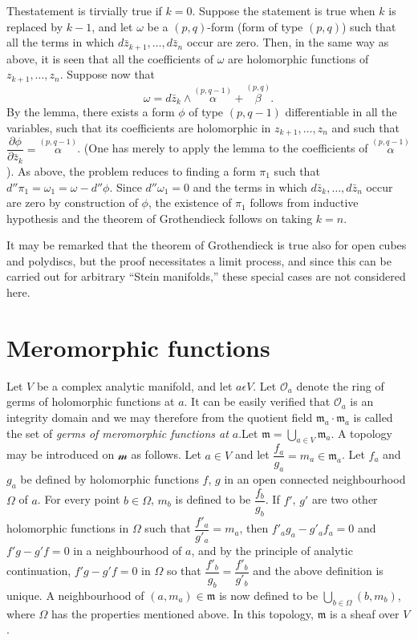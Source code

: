 The\pageoriginale statement is tirvially true if $k=0$. Suppose the
statement is true when $k$ is replaced by $k-1$, and let $\omega$ be a
$(p,q)$-form (form of type $(p,q)$) such that all the terms in which
$d \bar{z}_{k+1}, \ldots, d \bar{z}_n$ occur are zero. Then, in the
same way as above, it is seen that all the coefficients of $\omega$
are holomorphic functions of $z_{k+1}, \ldots, z_n$. Suppose now that
$$
\omega= d \bar{z}_k \wedge \overset{(p,q-1)}{\alpha} +
\overset{(p,q)}{\beta}. 
$$
By the lemma, there exists a form $\phi$ of type $(p, q-1)$
differentiable in all the variables, such that its coefficients are
holomorphic in $z_{k+1}, \ldots, z_n$ and such that $\dfrac{\partial
  \phi}{\partial \bar{z}_k} = \overset{(p,q-1)}{\alpha}$. (One has
merely to apply the lemma to the coefficients of
$\overset{(p,q-1)}{\alpha}$). As above, the problem reduces to finding
a form $\pi_1$ such that $d''\pi_1 = \omega_1 = \omega -
d''\phi$. Since $d''\omega_1 =0$ and the terms in which $d \bar{z}_k,
\ldots, d \bar{z}_n$ occur are zero by construction of $\phi$, the
existence of $\pi_1$ follows from inductive hypothesis and the theorem
of Grothendieck follows on taking $k=n$. 

It may be remarked that the theorem of Grothendieck is true also for
open cubes and polydiscs, but the proof necessitates a limit process,
and since this can be carried out for arbitrary ``Stein manifolds,''
these special cases are not considered here.

\section{Meromorphic functions}\label{chap8:sec4}

Let $V$ be a complex analytic manifold, and let $a \epsilon V$. Let
$\mathscr{O}_a$ denote the ring of germs of holomorphic functions at
$a$. It can be easily verified that $\mathscr{O}_a$ is an integrity
domain and we may therefore from the quotient field $\mathfrak{m}_a
\cdot \mathfrak{m}_a$ is called the set of \textit{germs of meromorphic
functions at $a$}.\pageoriginale Let $\mathfrak{m} = \bigcup\limits_{a
\in V} \mathfrak{m}_a$. A topology may be introduced on $\mathscr{m}$
as follows. Let $a \in V$ and let $\dfrac{f_a}{g_a} = m_a \in
\mathfrak{m}_a$. Let $f_a$ and $g_a$ be defined by holomorphic
functions $f$, $g$ in an open connected neighbourhood $\Omega$ of
$a$. For every point $b \in \Omega$, $m_b$ is defined to be
$\dfrac{f_b}{g_b}$. If $f'$, $g'$ are two other holomorphic functions
in $\Omega$ such that $\dfrac{f'_a}{g'_a} = m_a$, then $f'_a g_a -
g'_a f_a = 0$ and $f' g - g'f =0$ in a neighbourhood of $a$, and by
the principle of analytic continuation, $f'g -g 'f =0$ in $\Omega$ so
that $\dfrac{f'_b}{g_b} = \dfrac{f'_b}{g'_b}$ and the above definition
is unique. A neighbourhood of $(a, m_a) \in\mathfrak{m}$ is now
defined to be $\bigcup\limits_{b \in \Omega} (b, m_b)$, where $\Omega$
has the properties mentioned above. In this topology, $\mathfrak{m}$
is a sheaf over $V$.

